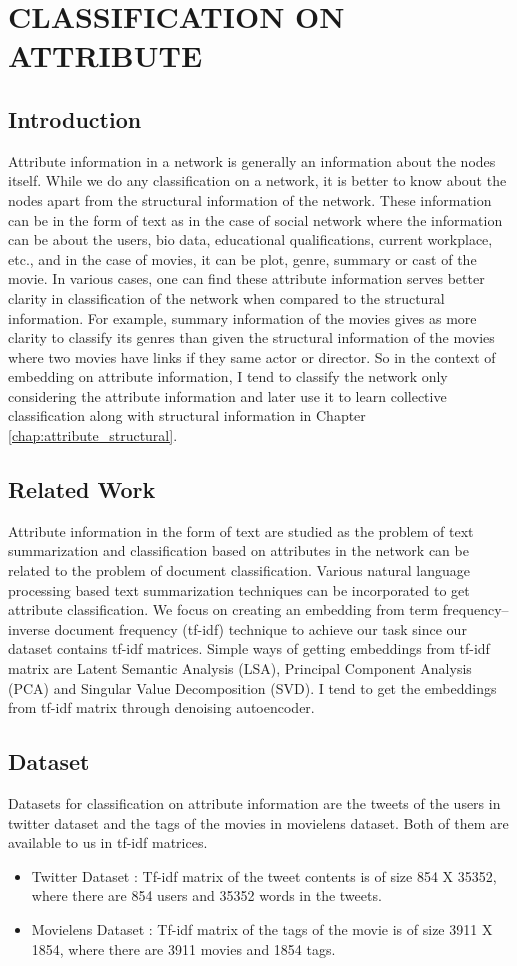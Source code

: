 \chapter{CLASSIFICATION ON ATTRIBUTE}
 \label{chap:attribute}
\section{Introduction}
Attribute information in a network is generally an information about the nodes itself. While we do any classification on a network, it is better to know about the nodes apart from the structural information of the network. These information can be in the form of text as in the case of social network where the information can be about the users, bio data, educational qualifications, current workplace, etc., and in the case of movies, it can be plot, genre, summary or cast of the movie. In various cases, one can find these attribute information serves better clarity in classification of the network when compared to the structural information. For example, summary information of the movies gives as more clarity to classify its genres than given the structural information of the movies where two movies have links if they same actor or director. So in the context of embedding on attribute information, I tend to classify the network only considering the attribute information and later use it to learn collective classification along with structural information in Chapter \ref{chap:attribute_structural}.
\section{Related Work} 
 \label{sec:rw_att}
Attribute information in the form of text are studied as the problem of text summarization and classification based on attributes in the network can be related to the problem of document classification. Various natural language processing based text summarization techniques can be incorporated to get attribute classification. We focus on creating an embedding from term frequency–inverse document frequency (tf-idf) technique to achieve our task since our dataset contains tf-idf matrices. Simple ways of getting embeddings from tf-idf matrix are Latent Semantic Analysis (LSA), Principal Component Analysis (PCA) and Singular Value Decomposition (SVD). I tend to get the embeddings from tf-idf matrix through denoising autoencoder.

\section{Dataset}
\label{sec:data_att}
Datasets for classification on attribute information are the tweets of the users in twitter dataset and the tags of the movies in movielens dataset. Both of them are available to us in tf-idf matrices.
\begin{itemize}
    \item Twitter Dataset : Tf-idf matrix of the tweet contents is of size 854 X 35352, where there are 854 users and 35352 words in the tweets.  
    \item Movielens Dataset : Tf-idf matrix of the tags of the movie is of size 3911 X 1854, where there are 3911 movies and 1854 tags.
\end{itemize}
